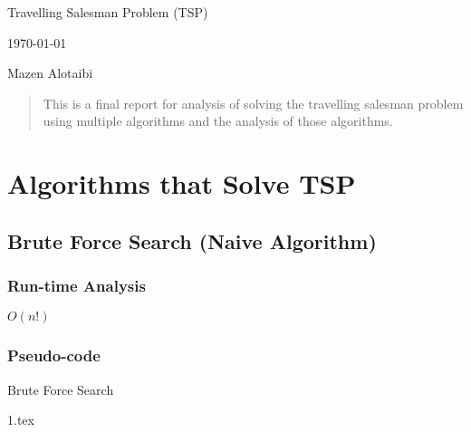 \documentclass[onecolumn, draftclsnofoot,10pt, compsoc]{IEEEtran}
\def \GroupMemberOne{			Mazen Alotaibi  }
\def \DocType{	Travelling Salesman Problem (TSP) }
\newcommand{\NameSigPair}[1]{\par
\makebox[2.75in][r]{#1} \hfil 	\makebox[3.25in]{\makebox[2.25in]{\hrulefill} \hfill		\makebox[.75in]{\hrulefill}}
\par\vspace{-12pt} \textit{\tiny\noindent
\makebox[2.75in]{} \hfil		\makebox[3.25in]{\makebox[2.25in][r]{Signature} \hfill	\makebox[.75in][r]{Date}}}}
\renewcommand{\NameSigPair}[1]{#1}
\begin{document}
\begin{titlepage}
    \begin{singlespace}
        \hfill 
        \par\vspace{.2in}
        \centering
        \scshape{
            \huge \DocType \par
            {\large\today}\par
            \vspace{.5in}
            \vfill
            \vspace{5pt}
            \vspace{5pt}
            {\Large
                \NameSigPair{\GroupMemberOne}\par
            }
            \vspace{20pt}
        }
        \begin{abstract}
        This is a final report for analysis of solving the travelling salesman problem using multiple algorithms and the analysis of those algorithms.
        \end{abstract}     
    \end{singlespace}
\end{titlepage}
\newpage
{}
\tableofcontents
\clearpage

\section{Algorithms that Solve TSP}
\subsection{Brute Force Search (Naive Algorithm)}
\subsubsection{Run-time Analysis}
$O(n!)$

\subsubsection{Pseudo-code}
\begin{algorithm}
\caption{Brute Force Search}
\label{alg:waypointAlgo}
\begin{algorithmic}[1]
{1.tex}
\end{algorithmic}
\end{algorithm}
\end{document}
